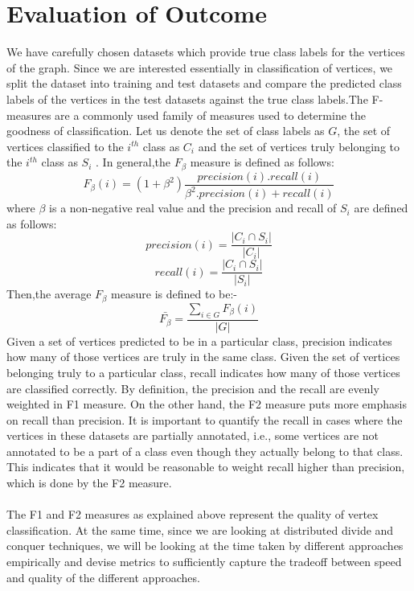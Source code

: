 \documentclass{article}
\begin{document}
\section*{Evaluation of Outcome}
We have carefully chosen datasets which provide true class labels for the vertices of the graph. Since we are interested essentially in classification of vertices, we split the dataset into training and test datasets and compare the predicted class labels of the vertices in the test datasets against the true class labels.The F-measures are a commonly used family of measures used to determine the goodness of classification. Let us denote the set of class labels as $G$, the set of vertices classified to the $i^{th}$ class as $C_i$ and the set of vertices truly belonging to the $i^{th}$ class as $S_i$ . In general,the $F_{\beta}$ measure is defined as follows:
\begin{equation}
F_{\beta}(i) = (1+{\beta^2}) \frac{precision(i).recall(i)}{{\beta^2}.precision(i)+recall(i)}
\end{equation}
where $\beta$ is a non-negative real value and the precision and recall of $S_i$ are defined as follows:
\begin{equation}
precision({i}) = \frac{ \left|{{C_{i}} \cap {S_{i}}}\right| }{ \left|{C_{i}}\right| } 
\end{equation} 
\begin{equation}
recall(i) = \frac{ \left|{{C_{i}} \cap {S_{i}}}\right| }{ \left| {S_{i}} \right| } 
\end{equation} 
Then,the average $F_{\beta}$ measure is defined to be:-
\begin{equation}
\bar{F_{\beta}} = \frac{\sum_{i \in G}{F_{\beta}(i)}}{ \left|{G}\right| }
\end{equation}
Given a set of vertices predicted to be in a particular class, precision indicates how many of those vertices are truly in the same class. Given the set of vertices belonging truly to a particular class, recall indicates how many of those vertices are classified correctly. By definition, the precision and the recall are evenly weighted in F1 measure. On the other hand, the F2 measure puts more emphasis on recall than precision. It is important to quantify the recall in cases where the vertices in these datasets are partially annotated, i.e., some vertices are not annotated to be a part of a class even though they actually belong to that class. This indicates that it would be reasonable to weight recall higher than precision, which is done by the F2 measure.
\\
\\
The F1 and F2 measures as explained above represent the quality of vertex classification. At the same time, since we are looking at distributed divide and conquer techniques, we will be looking at the time taken by different approaches empirically and devise metrics to sufficiently capture the tradeoff between speed and quality of the different approaches.
\end{document}
